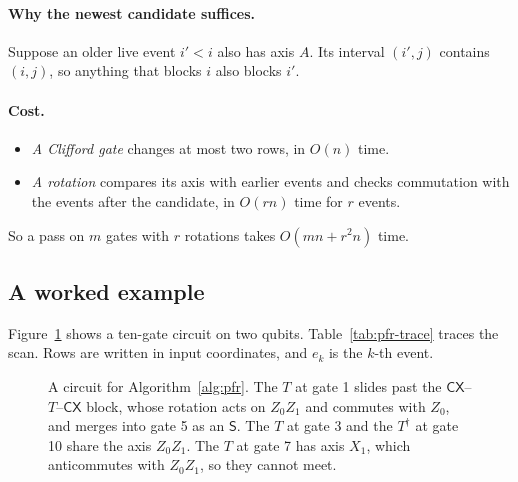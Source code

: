 \documentclass[11pt]{article}
\theoremstyle{definition}
\theoremstyle{remark}
\newcommand{\adj}{^{\dagger}}
\newcommand{\gate}[1]{\mathsf{#1}}
\begin{document}
\paragraph{Why the newest candidate suffices.}
Suppose an older live event $i' < i$ also has axis $A$. Its interval $(i', j)$ contains
$(i, j)$, so anything that blocks $i$ also blocks $i'$.

\paragraph{Cost.}
\begin{itemize}[nosep]
  \item \emph{A Clifford gate} changes at most two rows, in $O(n)$ time.
  \item \emph{A rotation} compares its axis with earlier events and checks commutation with
  the events after the candidate, in $O(rn)$ time for $r$ events.
\end{itemize}
So a pass on $m$ gates with $r$ rotations takes $O(mn + r^2 n)$ time.

\subsection{A worked example}

Figure~\ref{fig:pfr} shows a ten-gate circuit on two qubits. Table~\ref{tab:pfr-trace}
traces the scan. Rows are written in input coordinates, and $e_k$ is the $k$-th event.

\begin{figure}[h]
\centering
{}
\caption{A circuit for Algorithm~\ref{alg:pfr}. The $T$ at gate 1 slides past the
$\gate{CX}$--$T$--$\gate{CX}$ block, whose rotation acts on $Z_0Z_1$ and commutes with
$Z_0$, and merges into gate 5 as an $\gate S$. The $T$ at gate 3 and the $T\adj$ at
gate 10 share the axis $Z_0Z_1$. The $T$ at gate 7 has axis $X_1$, which anticommutes with
$Z_0Z_1$, so they cannot meet.}
\label{fig:pfr}
\end{figure}
\end{document}

